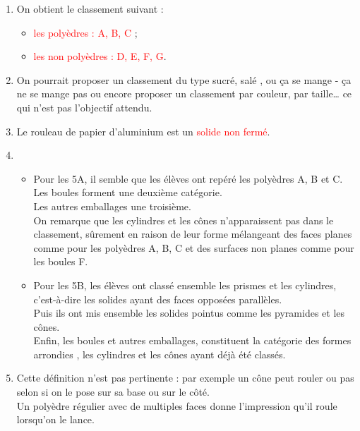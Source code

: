 \begin{corrige}
   \begin{enumerate}
      \item On obtient le classement suivant :
      \begin{itemize}
         \item \textcolor{red}{ les polyèdres : A, B, C} ;
         \item \textcolor{red}{ les non polyèdres : D, E, F, G}. 
      \end{itemize}
      \item On pourrait proposer un classement du type \og sucré, salé \fg{}, ou \og ça se mange - ça ne se mange pas \fg{} ou encore proposer un classement par couleur, par taille\dots{} ce qui n'est pas l'objectif attendu.
      \item Le rouleau de papier d'aluminium est un \textcolor{red}{ solide non fermé}. 
      \item 
      \begin{itemize}
         \item Pour les 5A, il semble que les élèves ont \og repéré \fg{} les polyèdres A, B et C. \\
           Les boules forment une deuxième catégorie. \\
           Les autres emballages une troisième. \\
           On remarque que les cylindres et les cônes n'apparaissent pas dans le classement, sûrement en raison de leur forme mélangeant des faces planes comme pour les polyèdres A, B, C et des surfaces non planes comme pour les boules F.
         \item Pour les 5B, les élèves ont classé ensemble les prismes et les cylindres, c'est-à-dire les solides ayant des faces opposées parallèles. \\
         Puis ils ont mis ensemble les solides \og pointus \fg{} comme les pyramides et les cônes. \\
         Enfin, les boules et autres emballages, constituent la catégorie des formes \og arrondies \fg{}, les cylindres et les cônes ayant déjà été classés. 
      \end{itemize}
      \item Cette définition n'est pas pertinente : par exemple un cône peut rouler ou pas selon si on le pose sur sa base ou sur le côté. \\
      Un polyèdre régulier avec de multiples faces donne l'impression qu'il roule lorsqu'on le lance.
   \end{enumerate}
\end{corrige}



